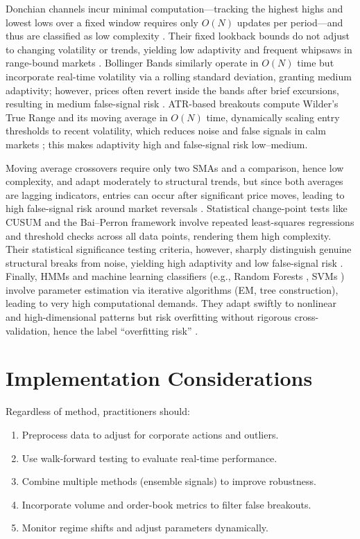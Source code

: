 \documentclass{article}
\begin{document}
Donchian channels incur minimal computation—tracking the highest highs and lowest lows over a fixed window requires only $O(N)$ updates per period—and thus are classified as low complexity \cite{donchian1960}. Their fixed lookback bounds do not adjust to changing volatility or trends, yielding low adaptivity and frequent whipsaws in range-bound markets \cite{murphy1999}. Bollinger Bands similarly operate in $O(N)$ time but incorporate real-time volatility via a rolling standard deviation, granting medium adaptivity; however, prices often revert inside the bands after brief excursions, resulting in medium false-signal risk \cite{bollinger2002}. ATR-based breakouts compute Wilder’s True Range and its moving average in $O(N)$ time, dynamically scaling entry thresholds to recent volatility, which reduces noise and false signals in calm markets \cite{wilder1978}; this makes adaptivity high and false-signal risk low–medium.

Moving average crossovers require only two SMAs and a comparison, hence low complexity, and adapt moderately to structural trends, but since both averages are lagging indicators, entries can occur after significant price moves, leading to high false-signal risk around market reversals \cite{brock1992}. Statistical change-point tests like CUSUM and the Bai–Perron framework involve repeated least-squares regressions and threshold checks across all data points, rendering them high complexity. Their statistical significance testing criteria, however, sharply distinguish genuine structural breaks from noise, yielding high adaptivity and low false-signal risk \cite{page1954,bai1998}. Finally, HMMs and machine learning classifiers (e.g., Random Forests \cite{breiman2001}, SVMs \cite{cortes1995}) involve parameter estimation via iterative algorithms (EM, tree construction), leading to very high computational demands. They adapt swiftly to nonlinear and high-dimensional patterns but risk overfitting without rigorous cross-validation, hence the label “overfitting risk” \cite{rabiner1989,scikit-learn}.
\section{Implementation Considerations}
Regardless of method, practitioners should:
\begin{enumerate}
\item Preprocess data to adjust for corporate actions and outliers.
\item Use walk-forward testing to evaluate real-time performance.
\item Combine multiple methods (ensemble signals) to improve robustness.
\item Incorporate volume and order-book metrics to filter false breakouts.
\item Monitor regime shifts and adjust parameters dynamically.
\end{enumerate}
\end{document}
